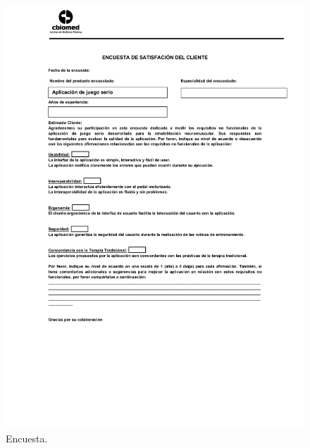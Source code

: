 \begin{figure}[!ht]
    \centering
    \includegraphics[width=\textwidth, height=0.9\textheight]{images/annexes/poll.png}
    \caption{Encuesta.}
    \label{annex: poll}
\end{figure}